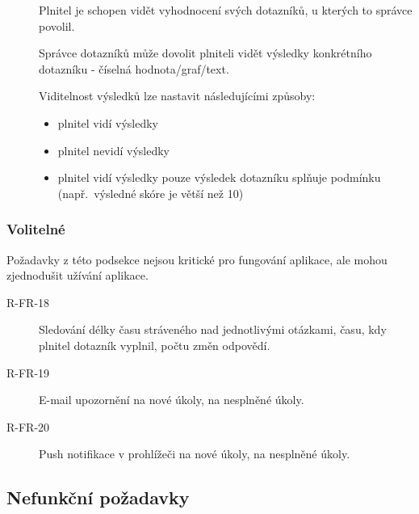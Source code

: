 \begin{description}
    \item[]
    Plnitel je schopen vidět vyhodnocení svých dotazníků, u kterých to správce povolil.
    \item[]
    Správce dotazníků může dovolit plniteli vidět výsledky konkrétního dotazníku - číselná hodnota/graf/text.
    \item[]
    Viditelnost výsledků lze nastavit následujícími způsoby:

    \begin{itemize}
        \item
        plnitel vidí výsledky
        \item
        plnitel nevidí výsledky
        \item
        plnitel vidí výsledky pouze výsledek dotazníku splňuje podmínku (např.\ výsledné skóre je větší než 10)
    \end{itemize}
\end{description}

\subsubsection{Volitelné}

Požadavky z této podsekce nejsou kritické pro fungování aplikace, ale mohou zjednodušit užívání aplikace.

\begin{description}
    \item[R-FR-18]
    Sledování délky času stráveného nad jednotlivými otázkami, času, kdy plnitel dotazník vyplnil, počtu změn odpovědí.
    \item[R-FR-19]
    E-mail upozornění na nové úkoly, na nesplněné úkoly.
    \item[R-FR-20]
    Push notifikace v prohlížeči na nové úkoly, na nesplněné úkoly.
\end{description}

\subsection{Nefunkční požadavky}\label{subsec:nefunkcni-pozadavky}

